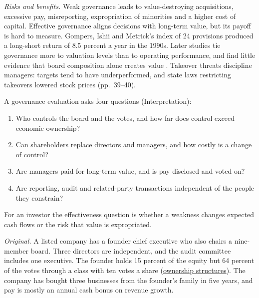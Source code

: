 \begin{qfmethod}
\emph{Risks and benefits.} Weak governance leads to value-destroying acquisitions, excessive pay, misreporting, expropriation of minorities and a higher cost of capital. Effective governance aligns decisions with long-term value, but its payoff is hard to measure. Gompers, Ishii and Metrick's index of 24 provisions produced a long-short return of 8.5 percent a year in the 1990s. Later studies tie governance more to valuation levels than to operating performance, and find little evidence that board composition alone creates value \citep[pp.~25--26]{applied-corporate-finance-2014}. Takeover threats discipline managers: targets tend to have underperformed, and state laws restricting takeovers lowered stock prices (pp.~39--40).

 A governance evaluation asks four questions (Interpretation):
\begin{enumerate}
\item Who controls the board and the votes, and how far does control exceed economic ownership?
\item Can shareholders replace directors and managers, and how costly is a change of control?
\item Are managers paid for long-term value, and is pay disclosed and voted on?
\item Are reporting, audit and related-party transactions independent of the people they constrain?
\end{enumerate}
For an investor the effectiveness question is whether a weakness changes expected cash flows or the risk that value is expropriated.

 \emph{Original.} A listed company has a founder chief executive who also chairs a nine-member board. Three directors are independent, and the audit committee includes one executive. The founder holds 15 percent of the equity but 64 percent of the votes through a class with ten votes a share (\hyperref[def:global-ownership-structures]{ownership structures}). The company has bought three businesses from the founder's family in five years, and pay is mostly an annual cash bonus on revenue growth.


\end{qfmethod}
